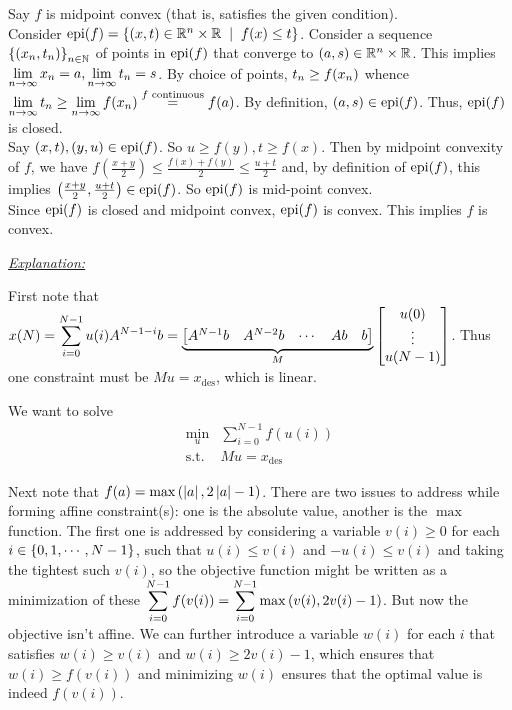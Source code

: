 \begin{enumerate}[leftmargin=*]
Say $f$ is midpoint convex (that is, satisfies the given condition). \\
Consider $\epi(f) = \set{(x,t)\in \R^{n}\times\R\st f(x)\leq t}$. Consider a sequence $\left\{(x_{n},t_{n})\right\}_{n\in\mathbb{N}}$ of points in $\text{epi}(f)$ that converge to $(a,s)\in \mathbb{R}^{n}\times\mathbb{R}$. This implies $\displaystyle\lim_{n\to\infty} x_{n} = a, \lim_{n\to\infty} t_{n}=s$. By choice of points, $\displaystyle t_{n}\ge f(x_{n})$ whence $\displaystyle \lim_{n\to\infty} t_{n}\ge \lim_{n\to\infty} f(x_{n}) \stackrel{f \text{ continuous}}{=} f(a)$. By definition, $(a,s)\in\text{epi}(f)$. Thus, $\text{epi}(f)$ is closed. \\
Say $(x,t),(y,u)\in\text{epi}(f)$. So $u\geq f(y), t\geq f(x)$. Then by midpoint convexity of $f$, we have $f\left(\frac{x+y}{2}\right) \leq \frac{f(x)+f(y)}{2} \leq \frac{u+t}{2}$ and, by definition of $\text{epi}(f)$, this implies $\left(\frac{x+y}{2},\frac{u+t}{2}\right)\in \text{epi}(f)$. So $\text{epi}(f)$ is mid-point convex.\\
Since $\text{epi}(f)$ is closed and midpoint convex, $\text{epi}(f)$ is convex. This implies $f$ is convex.
\end{enumerate}

\newpage

\pb

\soln


\textit{\underline{Explanation:}}

First note that $\displaystyle x(N) = \sum_{i=0}^{N-1}u(i)A^{N-1-i}b = \underbrace{\begin{bmatrix}A^{N-1}b & A^{N-2}b & \cdots & Ab & b\end{bmatrix}}_{M}\begin{bmatrix}u(0)\\\vdots\\u(N-1)\end{bmatrix}$. Thus one constraint must be $\boxed{Mu = x_{\text{des}}}$, which is linear. 

We want to solve \[\begin{aligned}
\min_{u} &\sum_{i=0}^{N-1} f(u(i))\\
\text{s.t. } 
&M u = x_{\text{des}}
\end{aligned}\]


Next note that $f(a)=\max\left(\left| a \right|, 2\left| a \right|-1\right)$. There are two issues to address while forming affine constraint(s): one is the absolute value, another is the $\max$ function. The first one is addressed by considering a variable $v(i)\ge0$ for each $i\in\left\{0,1,\cdots,N-1\right\}$, such that $\boxed{u(i)\le v(i)}$ and $\boxed{-u(i)\le v(i)}$ and taking the tightest such $v(i)$, so the objective function might be written as a minimization of these $\displaystyle\sum_{i=0}^{N-1}f(v(i)) = \sum_{i=0}^{N-1}\max\left(v(i),2v(i)-1\right)$. But now the objective isn't affine. We can further introduce a variable $w(i)$ for each $i$ that satisfies $\boxed{w(i)\ge v(i)}$ and $\boxed{w(i)\ge 2v(i)-1}$, which ensures that $w(i)\ge f(v(i))$ and minimizing $w(i)$ ensures that the optimal value is indeed $f(v(i))$.
\\

